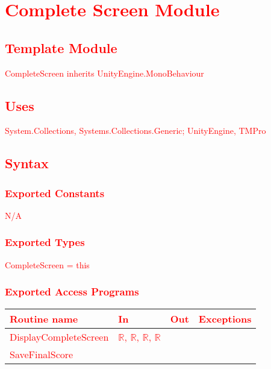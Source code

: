 \documentclass[12pt]{article}
\begin{document}
\newpage
\section{\textcolor{red}{Complete Screen Module}}

\subsection{\textcolor{red}{Template Module}}
\textcolor{red}{CompleteScreen inherits UnityEngine.MonoBehaviour}

\subsection {\textcolor{red}{Uses}}
\textcolor{red}{System.Collections, Systems.Collections.Generic; UnityEngine, TMPro}

\subsection {\textcolor{red}{Syntax}}

\subsubsection {\textcolor{red}{Exported Constants}}
\textcolor{red}{N/A}

\subsubsection {\textcolor{red}{Exported Types}}
\textcolor{red}{CompleteScreen = this}

\subsubsection {\textcolor{red}{Exported Access Programs}}

\begin{tabular}{| l | l | l | l |}
\hline
\textcolor{red}{\textbf{Routine name}} & \textcolor{red}{\textbf{In}} & \textcolor{red}{\textbf{Out}} & \textcolor{red}{\textbf{Exceptions}}\\
\hline
\textcolor{red}{DisplayCompleteScreen} & \textcolor{red}{$\mathbb{R}$, $\mathbb{R}$, $\mathbb{R}$, $\mathbb{R}$} & & \\
\hline
\textcolor{red}{SaveFinalScore} & & & \\
\hline
\end{tabular}
\end{document}
